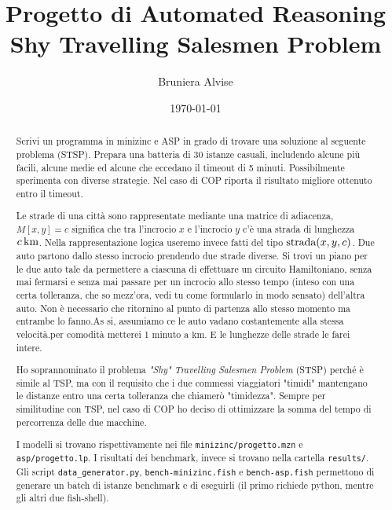 \documentclass[12pt, a4paper]{article}
\title{Progetto di Automated Reasoning\\Shy Travelling Salesmen Problem}
\author{Bruniera Alvise}
\affil{Università degli studi di Udine}
\date{\today}
\begin{document}
\maketitle

\newpage

\begin{abstract}
    Scrivi un programma in minizinc e ASP in grado di trovare una soluzione al seguente problema (STSP). Prepara una batteria di 30 istanze casuali, includendo alcune più facili, alcune medie ed alcune che eccedano il timeout di 5 minuti.
    Possibilmente sperimenta con diverse strategie. Nel caso di COP riporta il risultato migliore ottenuto entro il timeout.

    Le strade di una città sono rappresentate mediante una matrice di adiacenza, $M[x,y]=c$ significa che tra l'incrocio $x$ e l'incrocio $y$ c'è una strada di lunghezza $\qty[parse-numbers = false]{c}{\kilo\meter}$. Nella rappresentazione logica useremo invece fatti del tipo $\text{\lstinline{strada}}(x,y,c)$. Due auto partono dallo stesso incrocio prendendo due strade diverse. Si trovi un piano per le due auto tale da permettere a ciascuna di effettuare un circuito Hamiltoniano, senza mai fermarsi e senza mai passare per un incrocio allo stesso tempo (inteso con una certa tolleranza, che so mezz'ora, vedi tu come formularlo in modo sensato) dell'altra auto. Non è necessario che ritornino al punto di partenza allo stesso momento ma entrambe lo fanno.As si, assumiamo ce le auto vadano costantemente alla stessa velocità.per comodità metterei 1 minuto a $\unit{\kilo\meter}$. E le lunghezze delle strade le farei intere.

    Ho soprannominato il problema \emph{"Shy" Travelling Salesmen Problem} (STSP) perché è simile al TSP, ma con il requisito che i due commessi viaggiatori "timidi" mantengano le distanze entro una certa tolleranza che chiamerò "timidezza".
    Sempre per similitudine con TSP, nel caso di COP ho deciso di ottimizzare la somma del tempo di percorrenza delle due macchine.

    I modelli si trovano rispettivamente nei file \lstinline{minizinc/progetto.mzn} e \lstinline{asp/progetto.lp}. I risultati dei benchmark, invece si trovano nella cartella \lstinline{results/}.
    Gli script \lstinline{data_generator.py}, \lstinline{bench-minizinc.fish} e \lstinline{bench-asp.fish} permettono di generare un batch di istanze benchmark e di eseguirli (il primo richiede python, mentre gli altri due fish-shell).
\end{abstract}
\end{document}
